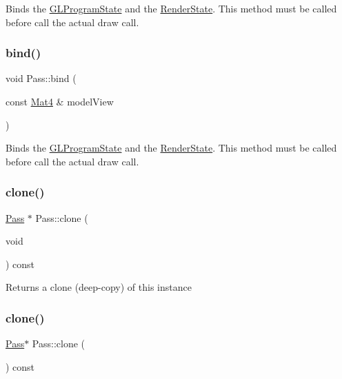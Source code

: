 Binds the \hyperlink{classGLProgramState}{G\+L\+Program\+State} and the \hyperlink{classRenderState}{Render\+State}. This method must be called before call the actual draw call. \mbox{\label{classPass_a61f3c6e7b46c51555c43d97619a13630}} 
\subsubsection{\texorpdfstring{bind()}{bind()}\hspace{0.1cm}{\footnotesize\ttfamily [2/2]}}
{\footnotesize\ttfamily void Pass\+::bind (\begin{DoxyParamCaption}\item[{const \hyperlink{classMat4}{Mat4} \&}]{model\+View }\end{DoxyParamCaption})}

Binds the \hyperlink{classGLProgramState}{G\+L\+Program\+State} and the \hyperlink{classRenderState}{Render\+State}. This method must be called before call the actual draw call. \mbox{\label{classPass_a4689b5cd4c248317f617934a9476cd10}} 
\subsubsection{\texorpdfstring{clone()}{clone()}\hspace{0.1cm}{\footnotesize\ttfamily [1/2]}}
{\footnotesize\ttfamily \hyperlink{classPass}{Pass} $\ast$ Pass\+::clone (\begin{DoxyParamCaption}\item[{void}]{ }\end{DoxyParamCaption}) const}

Returns a clone (deep-\/copy) of this instance \mbox{\label{classPass_afb85f28bbbbf322d85708ce8d69ae2bb}} 
\subsubsection{\texorpdfstring{clone()}{clone()}\hspace{0.1cm}{\footnotesize\ttfamily [2/2]}}
{\footnotesize\ttfamily \hyperlink{classPass}{Pass}$\ast$ Pass\+::clone (\begin{DoxyParamCaption}{ }\end{DoxyParamCaption}) const}

